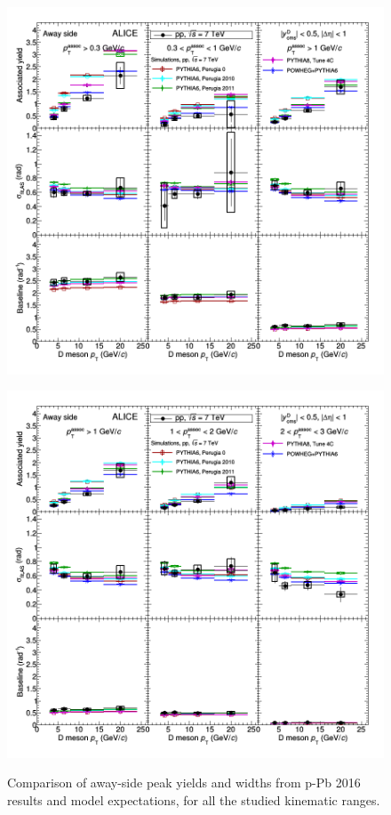 \begin{figure}[!htbp]
\centering
{\includegraphics[width=1.1\textwidth, angle=90]{figures/CfrPPandModels/ComparePPtoMCFitResultsAS.png}}
\end{figure}
\begin{figure}[!htbp]
\centering
{\includegraphics[width=1.1\textwidth, angle=90]{figures/CfrPPandModels/ComparePPtoMCFitResultsAS_2.png}}
\caption{Comparison of away-side peak yields and widths from p-Pb 2016 results and model expectations, for all the studied kinematic ranges.}
\label{fig:CfrObsModel2}
\end{figure}
